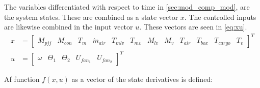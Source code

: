 The variables differentiated with respect to time in \cref{sec:mod_comp_mod}, are the system states. These are combined as a state vector $x$. The controlled inputs are likewise combined in the input vector $u$. These vectors are seen in \cref{eq:xu}.
\begin{equation}  \label{eq:xu}
	\begin{split}
		x &= \begin{bmatrix}
			M_{pjj}				&		%
			M_{con} 			&		%
			T_m 				&		%
			\dot{m}_{air}		&		%
			T_{mlv}				&		%
			T_{mv}				&		%
			M_{lv}				&		%
			M_v					&		%
			T_{air}				&		%
			T_{box}				&		%
			T_{cargo}			&		%
			T_v
		\end{bmatrix}^T \\
		u &= \begin{bmatrix}
			\omega				&
			\Theta_1			&			%
			\Theta_2 			&			%
			U_{fan_1}			&			%
			U_{fan_2}						%
		\end{bmatrix}^T
	\end{split}
\end{equation}


Af function $f(x,u)$ as a vector of the state derivatives is defined:

